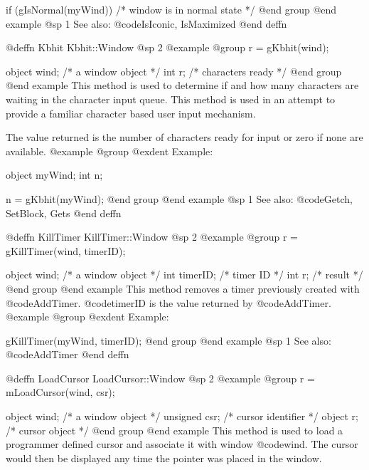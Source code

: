 if (gIsNormal(myWind))
        /* window is in normal state */
@end group
@end example
@sp 1
See also:  @code{IsIconic, IsMaximized}
@end deffn




@deffn {Kbhit} Kbhit::Window
@sp 2
@example
@group
r = gKbhit(wind);

object  wind;   /*  a window object   */
int     r;      /*  characters ready  */
@end group
@end example
This method is used to determine if and how many characters are waiting
in the character input queue.  This method is used in an attempt to
provide a familiar character based user input mechanism.

The value returned is the number of characters ready for input or
zero if none are available.
@example
@group
@exdent Example:

object  myWind;
int     n;

n = gKbhit(myWind);
@end group
@end example
@sp 1
See also:  @code{Getch, SetBlock, Gets}
@end deffn



















@deffn {KillTimer} KillTimer::Window
@sp 2
@example
@group
r = gKillTimer(wind, timerID);

object  wind;      /*  a window object  */
int     timerID;   /*  timer ID         */
int     r;         /*  result           */
@end group
@end example
This method removes a timer previously created with @code{AddTimer}.
@code{timerID} is the value returned by @code{AddTimer}.
@example
@group
@exdent Example:

gKillTimer(myWind, timerID);
@end group
@end example
@sp 1
See also:  @code{AddTimer}
@end deffn




@deffn {LoadCursor} LoadCursor::Window
@sp 2
@example
@group
r = mLoadCursor(wind, csr);

object   wind;  /*  a window object    */
unsigned csr;   /*  cursor identifier  */
object   r;     /*  cursor object      */
@end group
@end example
This method is used to load a programmer defined cursor and associate it
with window @code{wind}.  The cursor would then be displayed any time
the pointer was placed in the window.

